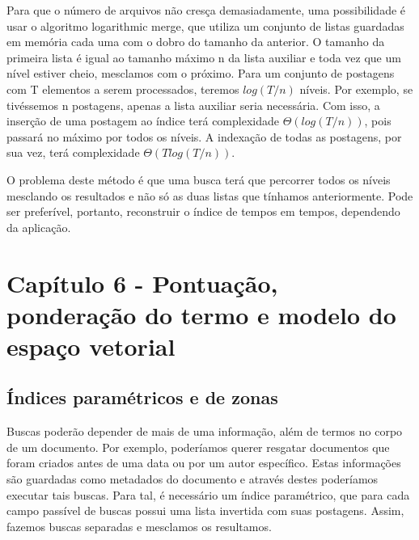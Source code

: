 Para que o número de arquivos não cresça demasiadamente, uma possibilidade é usar o algoritmo logarithmic merge, que utiliza um conjunto de listas guardadas em memória cada uma com o dobro do tamanho da anterior. O tamanho da primeira lista é igual ao tamanho máximo n da lista auxiliar e toda vez que um nível estiver cheio, mesclamos com o próximo. Para um conjunto de postagens com T elementos a serem processados, teremos $log( T/n )$ níveis. Por exemplo, se tivéssemos n postagens, apenas a lista auxiliar seria necessária. Com isso, a inserção de uma postagem ao índice terá complexidade $\Theta( log( T/n ))$, pois passará no máximo por todos os níveis. A indexação de todas as postagens, por sua vez, terá complexidade $\Theta( T log(T/n ))$.

O problema deste método é que uma busca terá que percorrer todos os níveis mesclando os resultados e não só as duas listas que tínhamos anteriormente. Pode ser preferível, portanto, reconstruir o índice de tempos em tempos, dependendo da aplicação.




\section{Capítulo 6 - Pontuação, ponderação do termo e modelo do espaço vetorial}
\label{sec:espaco_vetorial}

\subsection{Índices paramétricos e de zonas}

Buscas poderão depender de mais de uma informação, além de termos no corpo de um documento. Por exemplo, poderíamos querer resgatar documentos que foram criados antes de uma data ou por um autor específico. Estas informações são guardadas como metadados do documento e através destes poderíamos executar tais buscas. Para tal, é necessário um índice paramétrico, que para cada campo passível de buscas possui uma lista invertida com suas postagens. Assim, fazemos buscas separadas e mesclamos os resultamos.

